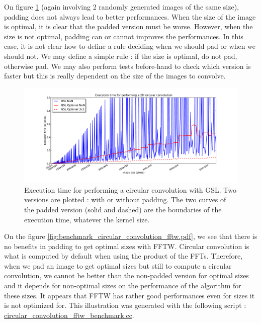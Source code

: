 \documentclass[a4paper,10pt,twoside]{article}
\begin{document}
On figure \ref{fig:benchmark_circular_convolution_gsl.pdf} (again involving 2 randomly generated images of the same size), padding does not always lead to better performances. When the size of the image is optimal, it is clear that the padded version must be worse. However, when the size is not optimal, padding can or cannot improves the performances. In this case, it is not clear how to define a rule deciding when we should pad or when we should not. We may define a simple rule : if the size is optimal, do not pad, otherwise pad. We may also perform tests before-hand to check which version is faster but this is really dependent on the size of the images to convolve.\\

\begin{figure}[htbp]
\center \includegraphics[width=0.75\linewidth]{Images/benchmark_circular_convolution_gsl.pdf}
\caption{\label{fig:benchmark_circular_convolution_gsl.pdf}Execution time for performing a circular convolution with GSL. Two versions are plotted : with or without padding. The two curves of the padded version (solid and dashed) are the boundaries of the execution time, whatever the kernel size.}
\end{figure}

On the figure \ref{fig:benchmark_circular_convolution_fftw.pdf}, we see that there is no benefits in padding to get optimal sizes with FFTW. Circular convolution is what is computed by default when using the product of the FFTs. Therefore, when we pad an image to get optimal sizes but still to compute a circular convolution, we cannot be better than the non-padded version for optimal sizes and it depends for non-optimal sizes on the performance of the algorithm for these sizes. It appears that FFTW has rather good performances even for sizes it is not optimized for. This illustration was generated with the following script : \href{http://jeremy.fix.free.Fr/Software/Convolution/circular_convolution_fftw_benchmark.cc}{circular\_convolution\_fftw\_benchmark.cc}.\\
\end{document}
